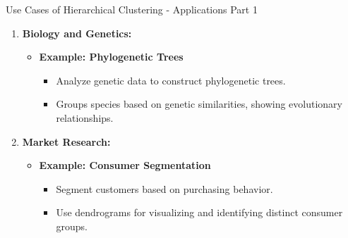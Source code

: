 \documentclass[aspectratio=169]{beamer}
\begin{document}
\begin{frame}[fragile]{Use Cases of Hierarchical Clustering - Applications Part 1}
    \begin{enumerate}
        \item \textbf{Biology and Genetics:}
            \begin{itemize}
                \item \textbf{Example: Phylogenetic Trees}
                \begin{itemize}
                    \item Analyze genetic data to construct phylogenetic trees.
                    \item Groups species based on genetic similarities, showing evolutionary relationships.
                \end{itemize}
            \end{itemize}
        \item \textbf{Market Research:}
            \begin{itemize}
                \item \textbf{Example: Consumer Segmentation}
                \begin{itemize}
                    \item Segment customers based on purchasing behavior.
                    \item Use dendrograms for visualizing and identifying distinct consumer groups.
                \end{itemize}
            \end{itemize}
    \end{enumerate}
\end{frame}
\end{document}
